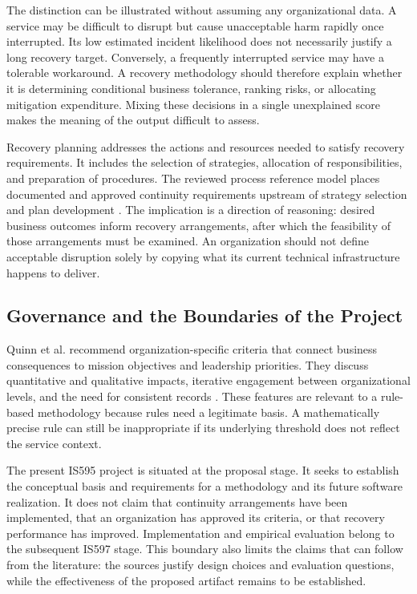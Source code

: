 The distinction can be illustrated without assuming any organizational data. A service may be difficult to disrupt but cause unacceptable harm rapidly once interrupted. Its low estimated incident likelihood does not necessarily justify a long recovery target. Conversely, a frequently interrupted service may have a tolerable workaround. A recovery methodology should therefore explain whether it is determining conditional business tolerance, ranking risks, or allocating mitigation expenditure. Mixing these decisions in a single unexplained score makes the meaning of the output difficult to assess.

Recovery planning addresses the actions and resources needed to satisfy recovery requirements. It includes the selection of strategies, allocation of responsibilities, and preparation of procedures. The reviewed process reference model places documented and approved continuity requirements upstream of strategy selection and plan development \cite{reference2026processes}. The implication is a direction of reasoning: desired business outcomes inform recovery arrangements, after which the feasibility of those arrangements must be examined. An organization should not define acceptable disruption solely by copying what its current technical infrastructure happens to deliver.

\subsection{Governance and the Boundaries of the Project}

Quinn et al. recommend organization-specific criteria that connect business consequences to mission objectives and leadership priorities. They discuss quantitative and qualitative impacts, iterative engagement between organizational levels, and the need for consistent records \cite{quinn2025bia}. These features are relevant to a rule-based methodology because rules need a legitimate basis. A mathematically precise rule can still be inappropriate if its underlying threshold does not reflect the service context.

The present IS595 project is situated at the proposal stage. It seeks to establish the conceptual basis and requirements for a methodology and its future software realization. It does not claim that continuity arrangements have been implemented, that an organization has approved its criteria, or that recovery performance has improved. Implementation and empirical evaluation belong to the subsequent IS597 stage. This boundary also limits the claims that can follow from the literature: the sources justify design choices and evaluation questions, while the effectiveness of the proposed artifact remains to be established.

